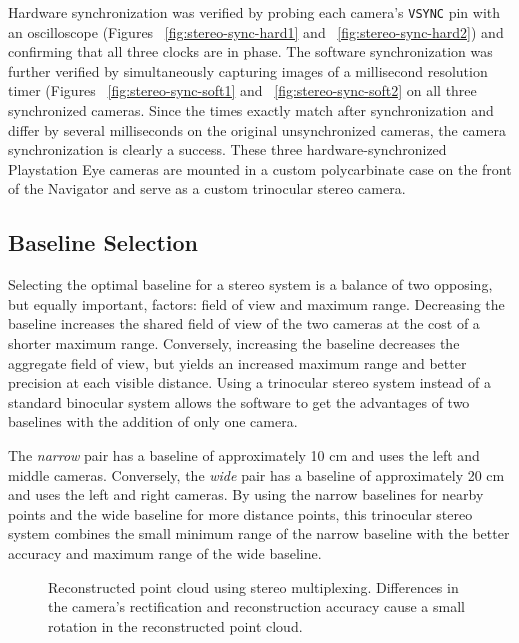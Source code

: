 \documentclass[twocolumn,11pt]{article}
\begin{document}
Hardware synchronization was verified by probing each camera's \texttt{VSYNC}
pin with an oscilloscope (Figures ~\ref{fig:stereo-sync-hard1} and
~\ref{fig:stereo-sync-hard2}) and confirming that all three clocks are in
phase. The software synchronization was further verified by simultaneously
capturing images of a millisecond resolution timer (Figures
~\ref{fig:stereo-sync-soft1} and ~\ref{fig:stereo-sync-soft2} on all three
synchronized cameras. Since the times exactly match after synchronization and
differ by several milliseconds on the original unsynchronized cameras, the
camera synchronization is clearly a success. These three hardware-synchronized
Playstation Eye cameras are mounted in a custom polycarbinate case on the front
of the Navigator and serve as a custom trinocular stereo camera.

\subsection{Baseline Selection}
\label{sec:stereo-mux}
Selecting the optimal baseline for a stereo system is a balance of two
opposing, but equally important, factors: field of view and maximum range.
Decreasing the baseline increases the shared field of view of the two cameras
at the cost of a shorter maximum range. Conversely, increasing the baseline
decreases the aggregate field of view, but yields an increased maximum range
and better precision at each visible distance. Using a trinocular stereo system
instead of a standard binocular system allows the software to get the
advantages of two baselines with the addition of only one camera.

The \textit{narrow} pair has a baseline of approximately 10 cm and uses the
left and middle cameras. Conversely, the \textit{wide} pair has a baseline of
approximately 20 cm and uses the left and right cameras. By using the narrow
baselines for nearby points and the wide baseline for more distance points,
this trinocular stereo system combines the small minimum range of the narrow
baseline with the better accuracy and maximum range of the wide baseline.

\begin{figure*}
	\centering
	\caption{
		Reconstructed point cloud using stereo multiplexing. Differences in the
		camera's rectification and reconstruction accuracy cause a small
		rotation in the reconstructed point cloud.
	}
	\label{fig:stereo-dist}
\end{figure*}
\end{document}
